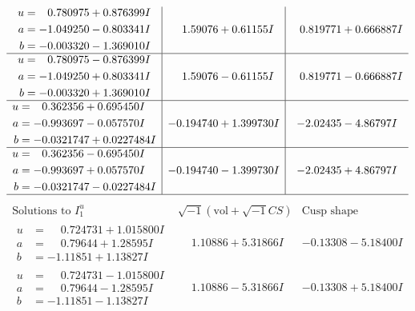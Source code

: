 \documentclass[1p]{elsarticle_modified}
\theoremstyle{definition}
\newcommand{\I}{\sqrt{-1}}
\begin{document}
$$\begin{array}{c|c|c}
\begin{aligned}
u &= \phantom{-}0.780975 + 0.876399 I \\
a &= -1.049250 - 0.803341 I \\
b &= -0.003320 - 1.369010 I\end{aligned}
 & \phantom{-}1.59076 + 0.61155 I & \phantom{-}0.819771 + 0.666887 I \\ \hline\begin{aligned}
u &= \phantom{-}0.780975 - 0.876399 I \\
a &= -1.049250 + 0.803341 I \\
b &= -0.003320 + 1.369010 I\end{aligned}
 & \phantom{-}1.59076 - 0.61155 I & \phantom{-}0.819771 - 0.666887 I \\ \hline\begin{aligned}
u &= \phantom{-}0.362356 + 0.695450 I \\
a &= -0.993697 - 0.057570 I \\
b &= -0.0321747 + 0.0227484 I\end{aligned}
 & -0.194740 + 1.399730 I & -2.02435 - 4.86797 I \\ \hline\begin{aligned}
u &= \phantom{-}0.362356 - 0.695450 I \\
a &= -0.993697 + 0.057570 I \\
b &= -0.0321747 - 0.0227484 I\end{aligned}
 & -0.194740 - 1.399730 I & -2.02435 + 4.86797 I\\
 \hline 
 \end{array}$$\newpage$$\begin{array}{c|c|c}  
\text{Solutions to }I^u_{1}& \I (\text{vol} + \sqrt{-1}CS) & \text{Cusp shape}\\
 \hline 
\begin{aligned}
u &= \phantom{-}0.724731 + 1.015800 I \\
a &= \phantom{-}0.79644 + 1.28595 I \\
b &= -1.11851 + 1.13827 I\end{aligned}
 & \phantom{-}1.10886 + 5.31866 I & -0.13308 - 5.18400 I \\ \hline\begin{aligned}
u &= \phantom{-}0.724731 - 1.015800 I \\
a &= \phantom{-}0.79644 - 1.28595 I \\
b &= -1.11851 - 1.13827 I\end{aligned}
 & \phantom{-}1.10886 - 5.31866 I & -0.13308 + 5.18400 I \\ \hline\begin{aligned}

\end{aligned}
\end{array}$$
\end{document}
